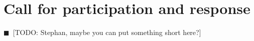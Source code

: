 \documentclass[11pt, oneside]{amsart}
\newcommand{\todo}[1]{{\color{blue}$\blacksquare$~\textsf{[TODO: #1]}}}
\begin{document}
\section{Call for participation and response} \label{sec:preworkshop}

\todo{Stephan, maybe you can put something short here?}

%
%
%
\end{document}
